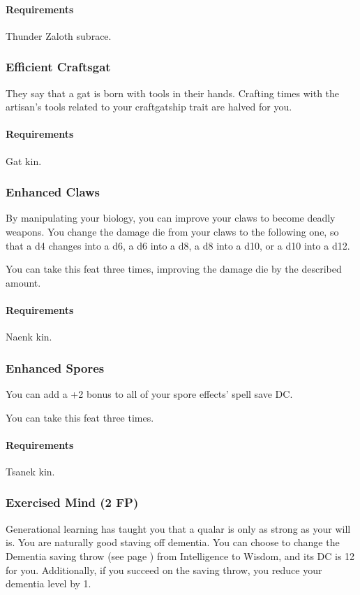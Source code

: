     \paragraph{Requirements} Thunder Zaloth subrace.
\subsubsection{Efficient Craftsgat} \label{feat::efficientcraftsgat}
    They say that a gat is born with tools in their hands.
    Crafting times with the artisan's tools related to your craftgatship trait are halved for you.
    \paragraph{Requirements} Gat kin.
\subsubsection{Enhanced Claws} \label{feat::enhancedclaws}
    By manipulating your biology, you can improve your claws to become deadly weapons.
    You change the damage die from your claws to the following one, so that a d4 changes into a d6, a d6 into a d8, a d8 into a d10, or a d10 into a d12.

    You can take this feat three times, improving the damage die by the described amount.
    \paragraph{Requirements} Naenk kin.
\subsubsection{Enhanced Spores} \label{feat::enhancedspores}
    You can add a +2 bonus to all of your spore effects' spell save DC.

    You can take this feat three times.
    \paragraph{Requirements} Tsanek kin.
\subsubsection{Exercised Mind (2 FP)} \label{feat::exercisedmind}
    Generational learning has taught you that a qualar is only as strong as your will is.
    You are naturally good staving off dementia.
    You can choose to change the Dementia saving throw (see page \pageref{ssec::dementia}) from Intelligence to Wisdom, and its DC is 12 for you.
    Additionally, if you succeed on the saving throw, you reduce your dementia level by 1.
